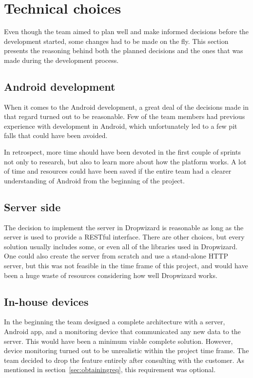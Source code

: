 \section{Technical choices}
Even though the team aimed to plan well and make informed decisions before the development started, some changes had to be made on the fly. This section presents the reasoning behind both the planned decisions and the ones that was made during the development process.

\subsection{Android development}
When it comes to the Android development, a great deal of the decisions made in that regard turned out to be reasonable. Few of the team members had previous experience with development in Android, which unfortunately led to a few pit falls that could have been avoided.

In retrospect, more time should have been devoted in the first couple of sprints not only to research, but also to learn more about how the platform works. A lot of time and resources could have been saved if the entire team had a clearer understanding of Android from the beginning of the project.

\subsection{Server side}

The decision to implement the server in Dropwizard is reasonable as long as the server is used to provide a RESTful interface. There are other choices, but every solution usually includes some, or even all of the libraries used in Dropwizard. One could also create the server from scratch and use a stand-alone HTTP server, but this was not feasible in the time frame of this project, and would have been a huge waste of resources considering how well Dropwizard works.

\subsection{In-house devices}
In the beginning the team designed a complete architecture with a server, Android app, and a monitoring device that communicated any new data to the server. This would have been a minimum viable complete solution. However, device monitoring turned out to be unrealistic within the project time frame. The team decided to drop the feature entirely after consulting with the customer. As mentioned in section~\ref{sec:obtainingreq}, this requirement was optional.

